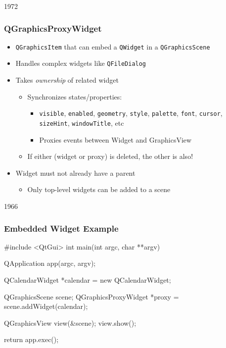 \begin{slide}{1972}
\frametitle{QGraphicsProxyWidget}
\begin{itemize}
\item \texttt{QGraphicsItem} that can embed a \texttt{QWidget} in a \texttt{QGraphicsScene}
\item Handles complex widgets like \texttt{QFileDialog}
\item Takes \textit{ownership} of related widget
    \begin{itemize}
    \item Synchronizes states/properties:
        \begin{itemize}
        \item \texttt{visible}, \texttt{enabled}, \texttt{geometry}, \texttt{style}, \texttt{palette}, \texttt{font}, \texttt{cursor}, \texttt{sizeHint}, \texttt{windowTitle}, etc
        \item Proxies events between Widget and GraphicsView
        \end{itemize}
    \item If either (widget or proxy) is deleted, the other is also!
    \end{itemize}
\item Widget must not already have a parent
    \begin{itemize}
    \item Only top-level widgets can be added to a scene
    \end{itemize}
\end{itemize}
\end{slide}


\begin{slide}[fragile]{1966}


\frametitle{Embedded Widget Example}
\begin{cpp}
#include <QtGui>
int main(int argc, char **argv) {
   QApplication app(argc, argv);

   QCalendarWidget *calendar = new QCalendarWidget;

   QGraphicsScene scene;
   QGraphicsProxyWidget *proxy = scene.addWidget(calendar);

   QGraphicsView view(&scene);
   view.show();

   return app.exec();
}
\end{cpp}
\end{slide}

